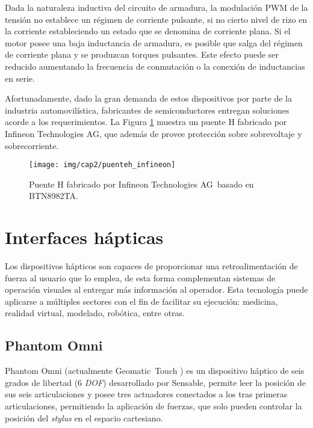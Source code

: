 Dada la naturaleza inductiva del circuito de armadura, la modulación PWM de la tensión no establece un régimen de corriente pulsante, si no cierto nivel de rizo en la corriente estableciendo un estado que se denomina de corriente plana. Si el motor posee una baja inductancia de armadura, es posible que salga del régimen de corriente plana y se produzcan torques pulsantes. Este efecto puede ser reducido aumentando la frecuencia de conmutación o la conexión de inductancias en serie.

Afortunadamente, dado la gran demanda de estos dispositivos por parte de la industria automovilística, fabricantes de semiconductores entregan soluciones acorde a los requerimientos. La Figura \ref{cap2_punteh_infineon} muestra un puente H fabricado por Infineon Technologies AG\textregistered, que además de provee protección sobre sobrevoltaje y sobrecorriente.

\begin{figure}[ht]
  \centering
  \texttt{[image: img/cap2/puenteh\_infineon]}
  \caption{Puente H fabricado por Infineon Technologies AG\textregistered \, basado en BTN8982TA.}
  \label{cap2_punteh_infineon}
\end{figure}

\section{Interfaces hápticas}

Los dispositivos hápticos son capaces de proporcionar una retroalimentación de fuerza al usuario que lo emplea, de esta forma complementan sistemas de operación visuales al entregar más información al operador. Esta tecnología puede aplicarse a múltiples sectores con el fin de facilitar su ejecución: medicina, realidad virtual, modelado, robótica, entre otras.

\subsection{Phantom Omni \texttrademark}

Phantom Omni \texttrademark (actualmente Geomatic\textregistered \, Touch \texttrademark) es un dispositivo háptico de seis grados de libertad (6 \textit{DOF}) desarrollado por Sensable\textregistered, permite leer la posición de sus seis articulaciones y posee tres actuadores conectados a los tras primeras articulaciones, permitiendo la aplicación de fuerzas, que solo pueden controlar la posición del \textit{stylus} en el espacio cartesiano.

